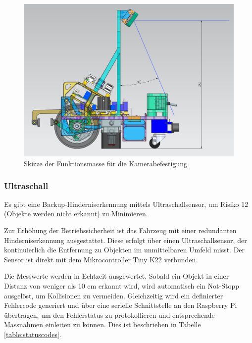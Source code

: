 \begin{figure}[H]
\centering
\includegraphics[width= \textwidth ]{assets/MT/Sichtfeld_Roboter.png}
\caption{Skizze der Funktionsmasse für die Kamerabefestigung}
\label{fig:Skizze der Funktionsmasse für die Kamerabefestigung}
\end{figure}


\subsubsection{Ultraschall}
\label{ultraschall}

Es gibt eine Backup-Hinderniserkennung mittels Ultraschallsensor, um Risiko 12 (Objekte werden nicht erkannt) zu Minimieren.

Zur Erhöhung der Betriebssicherheit ist das Fahrzeug mit einer redundanten Hinderniserkennung ausgestattet. Diese erfolgt über einen Ultraschallsensor, der kontinuierlich die Entfernung zu Objekten im unmittelbaren Umfeld misst. Der Sensor ist direkt mit dem Mikrocontroller Tiny K22 verbunden.

Die Messwerte werden in Echtzeit ausgewertet. Sobald ein Objekt in einer Distanz von weniger als 10 cm erkannt wird, wird automatisch ein Not-Stopp ausgelöst, um Kollisionen zu vermeiden. Gleichzeitig wird ein definierter Fehlercode generiert und über eine serielle Schnittstelle an den Raspberry Pi übertragen, um den Fehlerstatus zu protokollieren und entsprechende Massnahmen einleiten zu können. Dies ist beschrieben in Tabelle \ref{table:statuscodes}.







